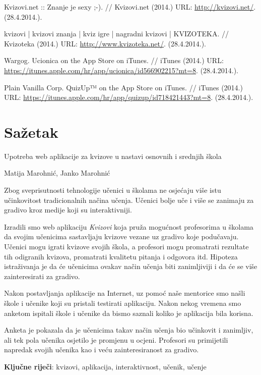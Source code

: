 \documentclass[11pt]{scrreprt}
\begin{document}
\begin{thebibliography}{99}
   Kvizovi.net :: Znanje je sexy ;-). // Kvizovi.net (2014.)
    URL: \url{http://kvizovi.net/}. (28.4.2014.).

   kvizovi | kvizovi znanja | kviz igre | nagradni kvizovi |
    KVIZOTEKA. // Kvizoteka (2014.) URL: \url{http://www.kvizoteka.net/}.
    (28.4.2014.).

   Wargog. Ucionica on the App Store on iTunes. // iTunes
    (2014.) URL:
    \url{https://itunes.apple.com/hr/app/ucionica/id566902215?mt=8}.
    (28.4.2014.).

   Plain Vanilla Corp. QuizUp™ on the App Store on iTunes. //
    iTunes (2014.) URL:
    \url{https://itunes.apple.com/hr/app/quizup/id718421443?mt=8}. (28.4.2014.).

\end{thebibliography}

\chapter{Sažetak}

Upotreba web aplikacije za kvizove u nastavi osnovnih i srednjih škola

Matija Marohnić, Janko Marohnić

Zbog sveprisutnosti tehnologije učenici u školama ne osjećaju više istu
učinkovitost tradicionalnih načina učenja. Učenici bolje uče i više se zanimaju
za gradivo kroz medije koji su interaktivniji.

Izradili smo web aplikaciju \textit{Kvizovi} koja pruža mogućnost profesorima u
školama da svojim učenicima sastavljaju kvizove vezane uz gradivo koje
podučavaju. Učenici mogu igrati kvizove svojih škola, a profesori mogu
promatrati rezultate tih odigranih kvizova, promatrati kvalitetu pitanja i
odgovora itd. Hipoteza istraživanja je da će učenicima ovakav način učenja biti
zanimljiviji i da će se više zainteresirati za gradivo.

Nakon postavljanja aplikacije na Internet, uz pomoć naše mentorice smo našli
škole i učenike koji su pristali testirati aplikaciju. Nakon nekog vremena smo
anketom ispitali škole i učenike da bismo saznali koliko je aplikacija bila
korisna.

Anketa je pokazala da je učenicima takav način učenja bio učinkovit i
zanimljiv, ali tek pola učenika osjetilo je promjenu u ocjeni. Profesori su
primijetili napredak svojih učenika kao i veću zainteresiranost za gradivo.

\textbf{Ključne riječi}: kvizovi, aplikacija, interaktivnost, učenik, učenje
\end{document}
